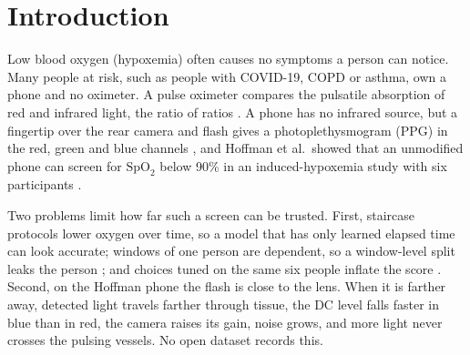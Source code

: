 \documentclass[11pt,letterpaper]{article}
\newcommand{\spo}{\ensuremath{\mathrm{SpO}_2}}
\begin{document}
\section{Introduction}\label{sec:intro}
Low blood oxygen (hypoxemia) often causes no symptoms a person can notice. Many people at risk, such as people with COVID-19, COPD or asthma, own a phone and no oximeter. A pulse oximeter compares the pulsatile absorption of red and infrared light, the ratio of ratios \cite{allen2007}. A phone has no infrared source, but a fingertip over the rear camera and flash gives a photoplethysmogram (PPG) in the red, green and blue channels \cite{scully2012}, and Hoffman et al.\ showed that an unmodified phone can screen for \spo{} below 90\% in an induced-hypoxemia study with six participants \cite{hoffman2022}.

Two problems limit how far such a screen can be trusted. First, staircase protocols lower oxygen over time, so a model that has only learned elapsed time can look accurate; windows of one person are dependent, so a window-level split leaks the person \cite{saeb2017}; and choices tuned on the same six people inflate the score \cite{varma2006}. Second, on the Hoffman phone the flash is close to the lens. When it is farther away, detected light travels farther through tissue, the DC level falls faster in blue than in red, the camera raises its gain, noise grows, and more light never crosses the pulsing vessels. No open dataset records this.
\end{document}
